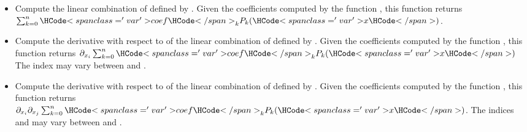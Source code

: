 \begin{itemize}
\item {}
  \sshortdescribe Compute the linear combination of  defined by
  . Given the coefficients computed by the function
  , this function returns $\sum_{k=0}^n
  \var{coef}_k  P_k(\var{x})$.

\item {}
  \sshortdescribe Compute the derivative with respect to  of the
  linear combination of  defined by . Given the
  coefficients computed by the function , this function
  returns $\partial_{x_i} \sum_{k=0}^n \var{coef}_k  P_k(\var{x})$ The index
   may vary between  and .


\item {}
  \sshortdescribe Compute the derivative with respect to  of the
  linear combination of  defined by . Given the
  coefficients computed by the function , this function
  returns $\partial_{x_i} \partial_{x_j} \sum_{k=0}^n \var{coef}_k
  P_k(\var{x})$.  The indices  and  may vary between  and
  .


\end{itemize}
